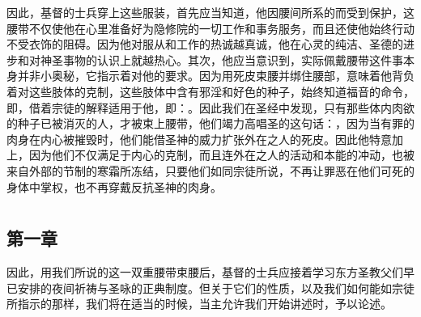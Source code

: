 因此，基督的士兵穿上这些服装，首先应当知道，他因腰间所系的而受到保护，这腰带不仅使他在心里准备好为隐修院的一切工作和事务服务，而且还使他始终行动不受衣饰的阻碍。因为他对服从和工作的热诚越真诚，他在心灵的纯洁、圣德的进步和对神圣事物的认识上就越热心。其次，他应当意识到，实际佩戴腰带这件事本身并非小奥秘，它指示着对他的要求。因为用死皮束腰并绑住腰部，意味着他背负着对这些肢体的克制，这些肢体中含有邪淫和好色的种子，始终知道福音的命令，即，借着宗徒的解释适用于他，即：。因此我们在圣经中发现，只有那些体内肉欲的种子已被消灭的人，才被束上腰带，他们竭力高唱圣的这句话：，因为当有罪的肉身在内心被摧毁时，他们能借圣神的威力扩张外在之人的死皮。因此他特意加上，因为他们不仅满足于内心的克制，而且连外在之人的活动和本能的冲动，也被来自外部的节制的寒霜所冻结，只要他们如同宗徒所说，不再让罪恶在他们可死的身体中掌权，也不再穿戴反抗圣神的肉身。\par



\section{}


\subsection{第一章}

\par

因此，用我们所说的这一双重腰带束腰后，基督的士兵应接着学习东方圣教父们早已安排的夜间祈祷与圣咏的正典制度。但关于它们的性质，以及我们如何能如宗徒所指示的那样，我们将在适当的时候，当主允许我们开始讲述时，予以论述。\par


